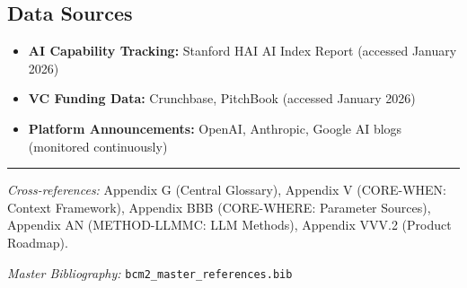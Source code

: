 \subsection{Data Sources}

\begin{itemize}[nosep]
    \item \textbf{AI Capability Tracking:} Stanford HAI AI Index Report (accessed January 2026)
    \item \textbf{VC Funding Data:} Crunchbase, PitchBook (accessed January 2026)
    \item \textbf{Platform Announcements:} OpenAI, Anthropic, Google AI blogs (monitored continuously)
\end{itemize}



\vspace{1em}
\hrule
\vspace{0.5em}

\noindent\textit{Cross-references:}
Appendix G (Central Glossary),
Appendix V (CORE-WHEN: Context Framework),
Appendix BBB (CORE-WHERE: Parameter Sources),
Appendix AN (METHOD-LLMMC: LLM Methods),
Appendix VVV.2 (Product Roadmap).

\noindent\textit{Master Bibliography:} \texttt{bcm2\_master\_references.bib}



